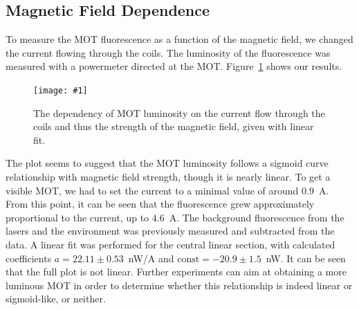 \documentclass[twocolumn]{article}
\newcommand{\insertFigure}[1]{%
   \texttt{[image: \#1]}%
}
\begin{document}
\subsection{Magnetic Field Dependence}
To measure the MOT fluorescence as a function of the magnetic field, we changed the current flowing through the coils. The luminosity of the fluorescence was measured with a powermeter directed at the MOT. Figure~\ref{fig:magnetic} shows our results. 
\begin{figure} [!h]
	\centering
	\insertFigure{Images/magnetic_dependence_w_linear.png}
	\caption{The dependency of MOT luminosity on the current flow through the coils and thus the strength of the magnetic field, given with linear fit.}
	\label{fig:magnetic}
\end{figure}
The plot seems to suggest that the MOT luminosity follows a sigmoid curve relationship with magnetic field strength, though it is nearly linear. To get a visible MOT, we had to set the current to a minimal value of around $0.9$~A. From this point, it can be seen that the fluorescence grew approximately proportional to the current, up to $4.6$~A. The background fluorescence from the lasers and the environment was previously measured and subtracted from the data. A linear fit was performed for the central linear section, with calculated coefficients $a = 22.11 \pm 0.53$~nW/A and $\text{const} = -20.9 \pm 1.5$~nW. It can be seen that the full plot is not linear. Further experiments can aim at obtaining a more luminous MOT in order to determine whether this relationship is indeed linear or sigmoid-like, or neither.
\end{document}
